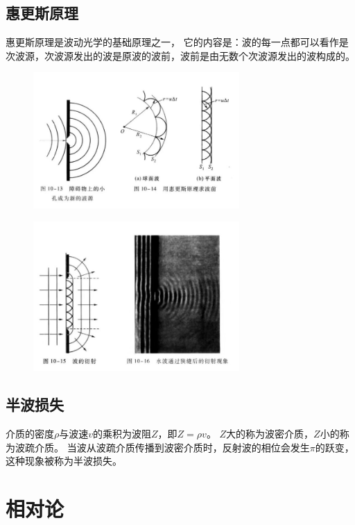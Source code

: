 \documentclass{ctexart}
\begin{document}
\subsection{惠更斯原理}
惠更斯原理是波动光学的基础原理之一，
它的内容是：波的每一点都可以看作是次波源，次波源发出的波是原波的波前，波前是由无数个次波源发出的波构成的。
\begin{figure}[H]
    \centering
    \includegraphics[width=0.7\textwidth]{img/10-13.jpg}
\end{figure}
\begin{figure}[H]
    \centering
    \includegraphics[width=0.7\textwidth]{img/10-15.jpg}
\end{figure}
\subsection{半波损失}
介质的密度$\rho$与波速$v$的乘积为波阻$Z$，即$Z = \rho v$。
$Z$大的称为波密介质，$Z$小的称为波疏介质。
当波从波疏介质传播到波密介质时，反射波的相位会发生$\pi$的跃变，这种现象被称为半波损失。
\section{相对论}
\end{document}
